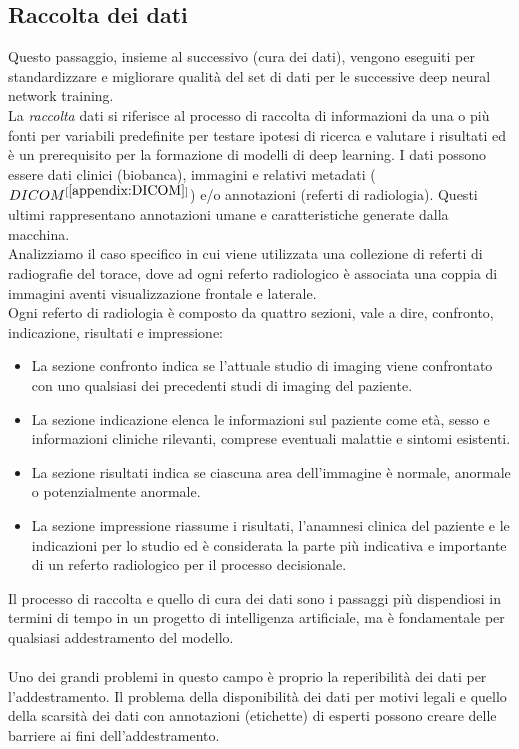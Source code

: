 \documentclass[12pt,a4paper]{report}
\begin{document}
\subsection{Raccolta dei dati}
Questo passaggio, insieme al successivo (cura dei dati), vengono eseguiti per standardizzare e migliorare qualità del set di dati per le successive deep neural network training.\\
La \emph{raccolta} dati si riferisce al processo di raccolta di informazioni da una o più fonti per variabili predefinite per testare ipotesi di ricerca e valutare i risultati ed è un prerequisito per la formazione di modelli di deep learning. 
I dati possono essere dati clinici (biobanca), immagini e relativi metadati ($DICOM^{[\ref{appendix:DICOM}]}$) e/o annotazioni (referti di radiologia). Questi ultimi rappresentano annotazioni umane e caratteristiche generate dalla macchina.\\
Analizziamo il caso specifico in cui viene utilizzata una collezione di referti di radiografie del torace, dove ad ogni referto radiologico è associata una coppia di immagini aventi visualizzazione frontale e laterale.\\
Ogni referto di radiologia è composto da quattro sezioni, vale a dire, confronto, indicazione, risultati e impressione:
\begin{itemize}
    \item La sezione confronto indica se l'attuale studio di imaging viene confrontato con uno qualsiasi dei precedenti studi di imaging del paziente.
    \item La sezione indicazione elenca le informazioni sul paziente come età, sesso e informazioni cliniche rilevanti, comprese eventuali malattie e sintomi esistenti.
    \item La sezione risultati indica se ciascuna area dell'immagine è normale, anormale o potenzialmente anormale.
    \item La sezione impressione riassume i risultati, l'anamnesi clinica del paziente e le indicazioni per lo studio ed è considerata la parte più indicativa e importante di un referto radiologico per il processo decisionale.
\end{itemize}

Il processo di raccolta e quello di cura dei dati sono i passaggi più dispendiosi in termini di tempo in un progetto di intelligenza artificiale, ma è fondamentale per qualsiasi addestramento del modello.\\
\\
Uno dei grandi problemi in questo campo è proprio la reperibilità dei dati per l’addestramento.
Il problema della disponibilità dei dati per motivi legali e quello della scarsità dei dati con annotazioni (etichette) di esperti possono creare delle barriere ai fini dell’addestramento.
\end{document}
